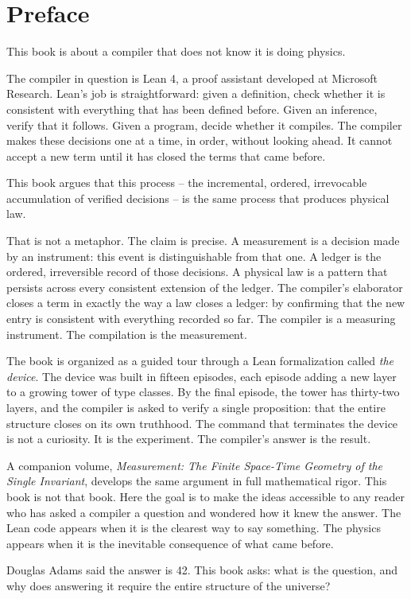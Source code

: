 \chapter*{Preface}
\label{chap:preface}

This book is about a compiler that does not know it is doing physics.

The compiler in question is Lean 4, a proof assistant developed at Microsoft
Research. Lean's job is straightforward: given a definition, check whether it
is consistent with everything that has been defined before. Given an inference,
verify that it follows. Given a program, decide whether it compiles. The
compiler makes these decisions one at a time, in order, without looking ahead.
It cannot accept a new term until it has closed the terms that came before.

This book argues that this process -- the incremental, ordered, irrevocable
accumulation of verified decisions -- is the same process that produces
physical law.

That is not a metaphor. The claim is precise. A measurement is a decision made
by an instrument: this event is distinguishable from that one. A ledger is the
ordered, irreversible record of those decisions. A physical law is a pattern
that persists across every consistent extension of the ledger. The compiler's
elaborator closes a term in exactly the way a law closes a ledger: by
confirming that the new entry is consistent with everything recorded so far.
The compiler is a measuring instrument. The compilation is the measurement.

The book is organized as a guided tour through a Lean formalization called
\textit{the device}. The device was built in fifteen episodes, each episode
adding a new layer to a growing tower of type classes. By the final episode,
the tower has thirty-two layers, and the compiler is asked to verify a single
proposition: that the entire structure closes on its own truthhood. The
 command that terminates the device is not a curiosity. It is the
experiment. The compiler's answer is the result.

A companion volume, \textit{Measurement: The Finite Space-Time Geometry of the
Single Invariant}, develops the same argument in full mathematical rigor. This
book is not that book. Here the goal is to make the ideas accessible to any
reader who has asked a compiler a question and wondered how it knew the answer.
The Lean code appears when it is the clearest way to say something. The physics
appears when it is the inevitable consequence of what came before.

Douglas Adams said the answer is 42. This book asks: what is the question, and
why does answering it require the entire structure of the universe?


